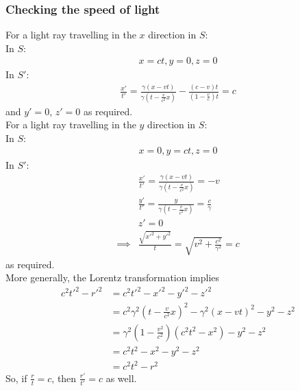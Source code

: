 \documentclass[a4paper]{article}
\begin{document}
\subsubsection{Checking the speed of light}
For a light ray travelling in the $x$ direction in $S$:\\
In $S$:
\begin{equation*}
\begin{aligned}
x=ct, y=0, z=0
\end{aligned}
\end{equation*}
In $S'$:
\begin{equation*}
\begin{aligned}
\frac{x'}{t'}=\frac{\gamma\left(x-vt\right)}{\gamma\left(t-\frac{v}{c^2}x\right)} - \frac{\left(c-v\right)t}{\left(1-\frac{v}{c}\right)t} = c
\end{aligned}
\end{equation*}
and $y'=0$, $z'=0$ as required.\\

For a light ray travelling in the $y$ direction in $S$:\\
In $S$:
\begin{equation*}
\begin{aligned}
x=0,y=ct,z=0
\end{aligned}
\end{equation*}
In $S'$:
\begin{equation*}
\begin{aligned}
&\frac{x'}{t'}=\frac{\gamma\left(x-vt\right)}{\gamma\left(t-\frac{v}{c^2}x\right)} = -v\\
&\frac{y'}{t'}=\frac{y}{\gamma\left(t-\frac{v}{c^2}x\right)}=\frac{c}{\gamma}\\
&z'=0\\
\implies &\frac{\sqrt{x'^2 + y'^2}}{t} = \sqrt{v^2 + \frac{c^2}{\gamma^2}}=c
\end{aligned}
\end{equation*}
as required.\\

More generally, the Lorentz transformation implies
\begin{equation*}
\begin{aligned}
c^2 t'^2 - r'^2 &= c^2 t'^2 - x'^2 - y'^2 - z'^2\\
&= c^2 \gamma^2\left(t-\frac{v}{c^2}x\right)^2 - \gamma^2\left(x-vt\right)^2 - y^2 - z^2\\
&=\gamma^2 \left(1-\frac{v^2}{c^2}\right)\left(c^2 t^2 - x^2\right) - y^2 - z^2\\
&=c^2 t^2 - x^2 - y^2 - z^2\\
&=c^2 t^2 - r^2
\end{aligned}
\end{equation*}
So, if $\frac{r}{t}=c$, then $\frac{r'}{t'}=c$ as well.
\end{document}
